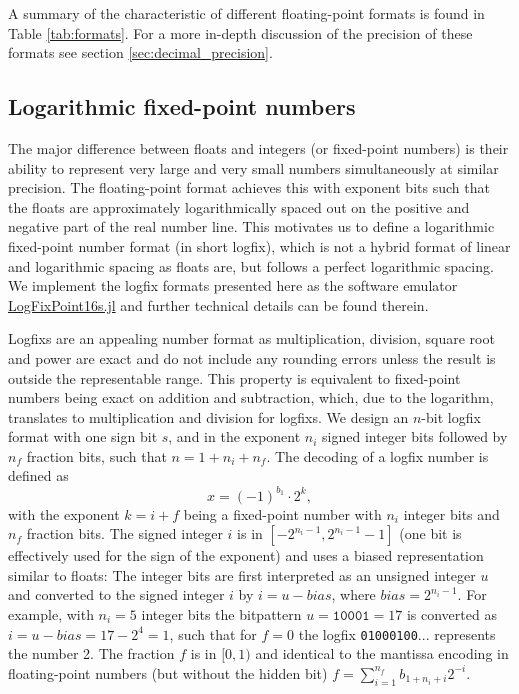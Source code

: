 A summary of the characteristic of different floating-point formats is found in Table \ref{tab:formats}. For a more in-depth discussion of
the precision of these formats see section \ref{sec:decimal_precision}.

\subsection{Logarithmic fixed-point numbers}
\label{sec:logfixs}

The major difference between floats and integers (or fixed-point numbers) is their ability to represent very large and very small
numbers simultaneously at similar precision. The floating-point format achieves this with exponent bits such that the floats are
approximately logarithmically spaced out on the positive and negative part of the real number line. This motivates us to define
a logarithmic fixed-point number format (in short logfix), which is not a hybrid format of linear and logarithmic spacing as floats are, but
follows a perfect logarithmic spacing. We implement the logfix formats presented here as the software emulator 
\href{https://github.com/milankl/LogFixPoint16s.jl}{LogFixPoint16s.jl} and further technical details can be found therein.

Logfixs are an appealing number format as multiplication, division, square root and power are exact and do not include any rounding
errors unless the result is outside the representable range. This property is equivalent to fixed-point numbers being exact
on addition and subtraction, which, due to the logarithm, translates to multiplication and division for logfixs. We design an $n$-bit logfix
format with one sign bit $s$, and in the exponent $n_i$ signed integer bits followed by $n_f$ fraction bits,
such that $n = 1 + n_i + n_f$. The decoding of a logfix number is defined as
\begin{equation}
x = (-1)^{b_1} \cdot 2^k,
\label{eq:logfix}
\end{equation}
with the exponent $k = i + f$ being a fixed-point number with $n_i$ integer bits and $n_f$ fraction bits. The signed integer $i$
is in $[-2^{n_i-1},2^{n_i-1}-1]$ (one bit is effectively used for the sign of the exponent) and uses a biased representation similar
to floats: The integer bits are first interpreted as an unsigned integer $u$ and converted to the signed integer $i$ by $i = u - bias$,
where $bias = 2^{n_i-1}$. For example, with $n_i = 5$ integer bits the bitpattern $u = \mathtt{10001} =  17$ is converted as
$i = u - bias = 17-2^4 = 1$, such that for $f=0$ the logfix \texttt{01000100$...$} represents the number 2. The fraction $f$
is in $[0,1)$ and identical to the mantissa encoding in floating-point numbers (but without the hidden bit)
$f = \sum_{i=1}^{n_f} b_{1+n_i+i} 2^{-i}$.

